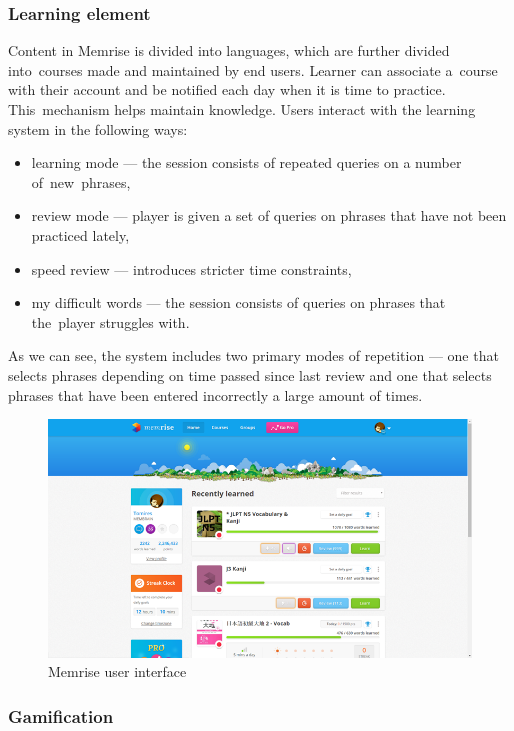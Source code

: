 \documentclass[thesis=B,english,hidelinks]{FITthesisXE}[2012/06/26]
\begin{document}
\subsubsection{Learning element}

Content in Memrise is divided into languages, which are further divided into~courses made and maintained by end users. Learner can associate a~course with their account and be notified each day when it is time to practice. This~mechanism helps maintain knowledge. Users interact with the learning system in the following ways:

\begin{itemize}
\item learning mode --- the session consists of repeated queries on a number of~new~phrases,
\item review mode --- player is given a set of queries on phrases that have not been practiced lately,
\item speed review --- introduces stricter time constraints,
\item my difficult words --- the session consists of queries on phrases that the~player struggles with.
\end{itemize}

As we can see, the system includes two primary modes of repetition --- one that selects phrases depending on time passed since last review and one that selects phrases that have been entered incorrectly a large amount of times.

\begin{figure}[ht]
\centering
\includegraphics[scale=0.45]{memrise}
\caption{Memrise user interface}
\label{fig:memrise}
\end{figure}

\subsubsection{Gamification}
\end{document}
